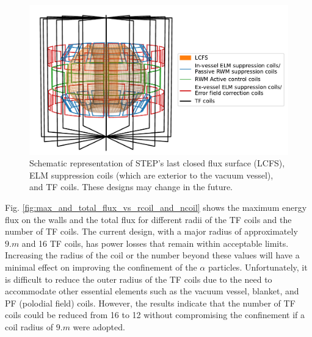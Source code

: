 \documentclass[10pt, a4paper, twoside]{article}
\begin{document}
\begin{figure}[!htb]
    \centering
    \includegraphics[width=0.7\linewidth]{Figures/coil_plot_3d.pdf}
    \caption{Schematic representation of STEP’s last closed flux surface (LCFS), ELM suppression coils (which are exterior to the vacuum vessel), and TF coils. These designs may change in the future. 
}
    \label{fig:coil_plot_3d}
\end{figure}

Fig. \ref{fig:max_and_total_flux_vs_rcoil_and_ncoil} shows the maximum energy flux on the walls and the total flux for different radii of the TF coils and the number of TF coils. The current design, with a major radius of approximately $\si{9.m}$ and 16 TF coils, has power losses that remain within acceptable limits. Increasing the radius of the coil or the number beyond these values will have a minimal effect on improving the confinement of the $\alpha$ particles. 
Unfortunately, it is difficult to reduce the outer radius of the TF coils due to the need to accommodate other essential elements such as the vacuum vessel, blanket, and PF (polodial field) coils. However, the results indicate that the number of TF coils could be reduced from 16 to 12 without compromising the confinement if a coil radius of $9\si{.m}$ were adopted.
\end{document}
